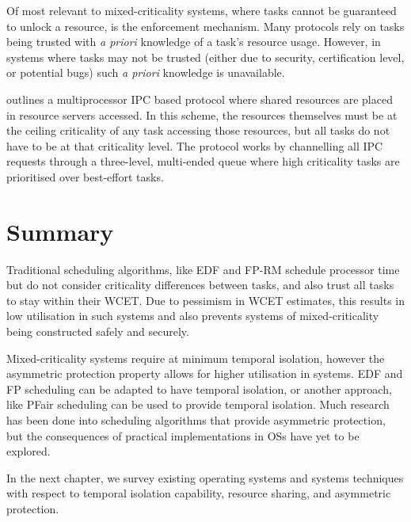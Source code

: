 Of most relevant to mixed-criticality systems, where tasks cannot be guaranteed to unlock a
resource, is the enforcement mechanism.  Many protocols rely on tasks being trusted with \emph{a
priori} knowledge of a task's resource usage.  However, in systems where tasks may not be trusted
(either due to security, certification level, or potential bugs) such \emph{a priori}
knowledge is unavailable. 

\citet{Brandenburg_14} outlines a multiprocessor \gls{IPC} based protocol where shared resources are placed in
resource servers accessed. In this scheme, the resources themselves must be at the ceiling
criticality of any task accessing those resources, but all tasks do not have to be at that
criticality level. The protocol works by channelling all IPC requests through a three-level,
multi-ended queue where high criticality tasks are prioritised over best-effort tasks. 

\section{Summary}


Traditional scheduling algorithms, like \gls{EDF} and \gls{FP}-\gls{RM} schedule processor time but do not consider criticality differences between tasks, and also trust all tasks to stay within their \gls{WCET}.
Due to pessimism in \gls{WCET} estimates, this results in low utilisation in such systems and also
prevents systems of mixed-criticality being constructed safely and securely.

Mixed-criticality systems require at minimum temporal isolation, however the asymmetric protection property allows for higher utilisation in systems.
\gls{EDF} and \gls{FP} scheduling can be adapted to have temporal isolation, or another approach, like PFair scheduling can be used to provide temporal isolation.
Much research has been done into scheduling algorithms that provide asymmetric protection, but the consequences of practical implementations in \glspl{OS} have yet to be explored.

In the next chapter, we survey existing operating systems and systems techniques with respect to temporal isolation capability, resource sharing, and asymmetric protection.

